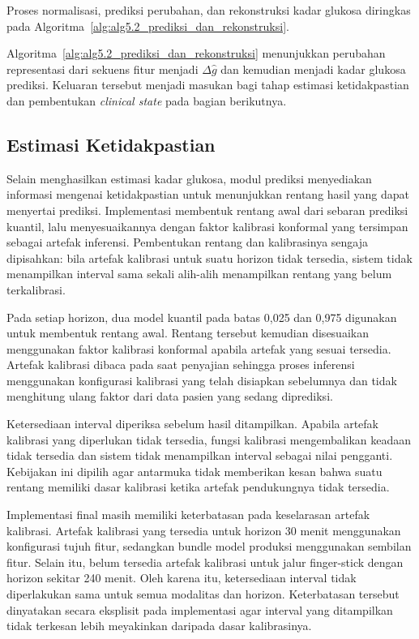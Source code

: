 Proses normalisasi, prediksi perubahan, dan rekonstruksi kadar glukosa diringkas pada Algoritma~\ref{alg:alg5.2_prediksi_dan_rekonstruksi}.



Algoritma~\ref{alg:alg5.2_prediksi_dan_rekonstruksi} menunjukkan perubahan representasi dari sekuens fitur menjadi $\Delta\hat{g}$ dan kemudian menjadi kadar glukosa
prediksi. Keluaran tersebut menjadi masukan bagi tahap estimasi ketidakpastian dan pembentukan \textit{clinical state} pada bagian berikutnya.

\subsection{Estimasi Ketidakpastian}
\label{subsec:bab5-ketidakpastian-prediksi}

Selain menghasilkan estimasi kadar glukosa, modul prediksi menyediakan informasi mengenai ketidakpastian untuk menunjukkan rentang hasil yang dapat menyertai prediksi. Implementasi
membentuk rentang awal dari sebaran prediksi kuantil, lalu menyesuaikannya dengan faktor kalibrasi konformal yang tersimpan sebagai artefak inferensi. Pembentukan
rentang dan kalibrasinya sengaja dipisahkan: bila artefak kalibrasi untuk suatu horizon tidak tersedia, sistem tidak menampilkan interval sama sekali alih-alih
menampilkan rentang yang belum terkalibrasi.

Pada setiap horizon, dua model kuantil pada batas 0,025 dan 0,975 digunakan untuk membentuk rentang awal. Rentang tersebut kemudian disesuaikan menggunakan faktor kalibrasi
konformal apabila artefak yang sesuai tersedia. Artefak kalibrasi dibaca pada saat penyajian sehingga proses inferensi menggunakan konfigurasi kalibrasi yang telah disiapkan
sebelumnya dan tidak menghitung ulang faktor dari data pasien yang sedang diprediksi.

Ketersediaan interval diperiksa sebelum hasil ditampilkan. Apabila artefak kalibrasi yang diperlukan tidak tersedia, fungsi kalibrasi mengembalikan keadaan tidak tersedia dan
sistem tidak menampilkan interval sebagai nilai pengganti. Kebijakan ini dipilih agar antarmuka tidak memberikan kesan bahwa suatu rentang memiliki dasar kalibrasi ketika
artefak pendukungnya tidak tersedia.

Implementasi final masih memiliki keterbatasan pada keselarasan artefak kalibrasi. Artefak kalibrasi yang tersedia untuk horizon 30 menit menggunakan konfigurasi tujuh fitur,
sedangkan bundle model produksi menggunakan sembilan fitur. Selain itu, belum tersedia artefak kalibrasi untuk jalur finger-stick dengan horizon sekitar 240 menit. Oleh karena
itu, ketersediaan interval tidak diperlakukan sama untuk semua modalitas dan horizon. Keterbatasan tersebut dinyatakan secara eksplisit pada implementasi agar interval yang ditampilkan tidak
terkesan lebih meyakinkan daripada dasar kalibrasinya.

